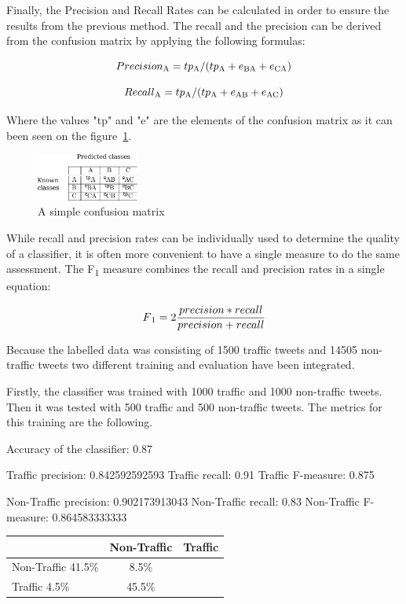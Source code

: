 Finally, the Precision and Recall Rates can be calculated in order to ensure the results from the previous method. The recall and the precision can be derived from the confusion matrix by applying the following formulas:

\[ Precision\textsubscript{A} = tp\textsubscript{A}/(tp\textsubscript{A}+e\textsubscript{BA}+e\textsubscript{CA}) \]

\[ Recall\textsubscript{A} = tp\textsubscript{A}/(tp\textsubscript{A}+e\textsubscript{AB}+e\textsubscript{AC}) \]

Where the values "tp" and "e" are the elements of the confusion matrix as it can been seen on the figure~\ref{fig:confisionMatixCalc}.

\begin{figure}[h]
    \centering
    \includegraphics[width=0.3\textwidth]{confusionMatrixCalc.pdf}
    \caption{A simple confusion matrix}
    \label{fig:confisionMatixCalc}
\end{figure}

While recall and precision rates can be individually used to determine the quality of a classifier, it is often more convenient to have a single measure to do the same assessment. The F\textsubscript{1} measure combines the recall and precision rates in a single equation:

\[ F\textsubscript{1} = 2\frac{precision*recall}{precision+recall} \]

Because the labelled data was consisting of 1500 traffic tweets and 14505 non-traffic tweets two different training and evaluation have been integrated. 

Firstly, the classifier was trained with 1000 traffic and 1000 non-traffic tweets. Then it was tested with 500 traffic and 500 non-traffic tweets. The metrics for this training are the following. 

Accuracy of the classifier:   0.87

Traffic precision:            0.842592592593
Traffic recall:               0.91
Traffic F-measure:            0.875

Non-Traffic precision:        0.902173913043
Non-Traffic recall:           0.83
Non-Traffic F-measure:        0.864583333333

\begin{tabular}{| l || c | c | }
    \hline
          & Non-Traffic & Traffic \\ \hline \hline
        Non-Traffic 41.5\% & 8.5\% \\ \hline
        Traffic 4.5\% & 45.5\% \\ \hline
    \end{tabular}
    \caption{Confusion Matrix with 1000 traffic and 1000 non-traffic tweets.}
    \label{fig:confusionMatrix1}
	

